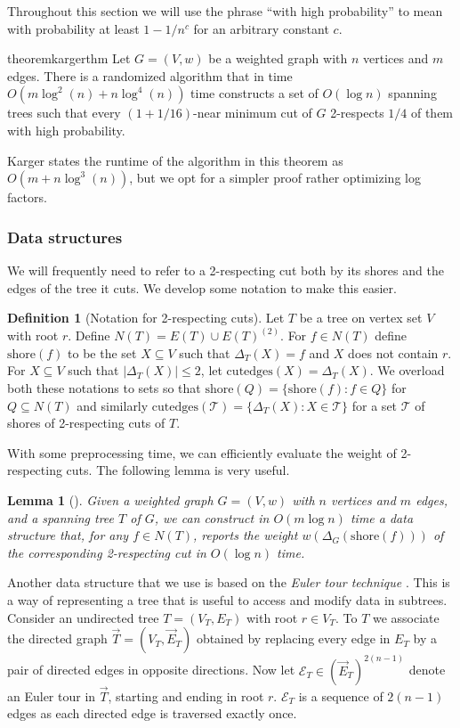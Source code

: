 \documentclass[10pt,a4paper]{article}
\newcommand{\Tcal}{\mathcal{T}}
\newcommand{\shore}{\mathrm{shore}}
\newcommand{\edges}{\mathrm{cutedges}}
\newcommand{\Ecal}{\mathcal{E}}
\newcommand{\1}{\mathbf{1}}
\newtheorem{lemma}[theorem]{Lemma}
\theoremstyle{definition}
\newtheorem{definition}[theorem]{Definition}
\begin{document}
Throughout this section we will use the phrase ``with high probability'' to mean with probability at least $1-1/n^c$ for an arbitrary constant $c$.
\begin{restatable}{theorem}{kargerthm} \label{thm:karger}
Let $G = (V,w)$ be a weighted graph with $n$ vertices and $m$ edges.  There is a randomized algorithm that in time 
$O(m \log^2(n) + n\log^4(n))$ time constructs a set of $O(\log n)$ spanning trees such that every $(1+1/16)$-near minimum cut of $G$ 2-respects $1/4$ of them with high probability.
\end{restatable}
Karger states the runtime of the algorithm in this theorem as $O(m + n \log^3(n))$, but we opt for a simpler proof rather optimizing log factors.

\subsubsection{Data structures}
We will frequently need to refer to a 2-respecting cut both by its shores and the edges of the tree it cuts.  We develop some notation to make this easier.
\begin{definition}[Notation for 2-respecting cuts]
Let $T$ be a tree on vertex set $V$ with root $r$.  Define $N(T) = E(T) \cup E(T)^{(2)}$.
For $f \in N(T)$ define $\shore(f)$ to be the set $X \subseteq V$  such that $\Delta_T(X) = f$ and $X$ does not contain $r$.
For $X \subseteq V$ such that $|\Delta_T(X)| \le 2$, 
let $\edges(X) = \Delta_T(X)$.  We overload both these notations to sets so that $\shore(Q) = \{\shore(f): f \in Q\}$ for $Q \subseteq N(T)$ and similarly 
$\edges(\Tcal) = \{\Delta_T(X): X \in \Tcal\}$ for a set $\Tcal$ of shores of 2-respecting cuts of $T$.  
\end{definition}

With some preprocessing time, we can efficiently evaluate the weight of 2-respecting cuts.  The following lemma is very useful.
\begin{lemma}[{\cite[Lemma 1]{GMW20c}}] \label{lem:eval-cuts}
Given a weighted graph $G = (V,w)$ with $n$ vertices and $m$ edges, and a spanning tree $T$ of $G$, we can construct in $O(m \log n)$ time a data structure that, for any $f \in N(T)$,
reports the weight $w(\Delta_G(\shore(f)))$ of the corresponding 2-respecting cut in $O(\log n)$ time.
\end{lemma}



Another data structure that we use is based on the \emph{Euler tour technique} \cite{TV84,HK95}.
This is a way of representing a tree that is useful to access and modify data in subtrees.
Consider an undirected tree $T=(V_T,E_T)$ with root $r \in V_T$.
To $T$ we associate the directed graph $\vec T = (V_T, \vec E_T)$ obtained by replacing every edge in $E_T$ by a pair of directed edges in opposite directions.
Now let $\Ecal_T \in (\vec E_T)^{2(n-1)}$ denote an Euler tour in $\vec T$, starting and ending in root $r$.
$\Ecal_T$ is a sequence of $2(n-1)$ edges as each directed edge is traversed exactly once.
\end{document}
